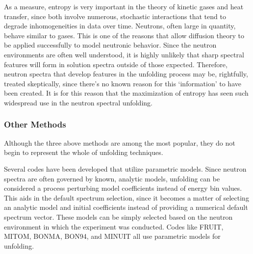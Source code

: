 As a measure, entropy is very important in the theory of kinetic gases and heat transfer, since both involve numerous, stochastic interactions that tend to degrade inhomogeneities in data over time.
Neutrons, often large in quantity, behave similar to gases.
This is one of the reasons that allow diffusion theory to be applied successfully to model neutronic behavior.
Since the neutron environments are often well understood, it is highly unlikely that sharp spectral features will form in solution spectra outside of those expected.
Therefore, neutron spectra that develop features in the unfolding process may be, rightfully, treated skeptically, since there's no known reason for this `information' to have been created.
It is for this reason that the maximization of entropy has seen such widespread use in the neutron spectral unfolding.


\subsubsection{Other Methods}

Although the three above methods are among the most popular, they do not begin to represent the whole of unfolding techniques.

Several codes have been developed that utilize parametric models.
Since neutron spectra are often governed by known, analytic models, unfolding can be considered a process perturbing model coefficients instead of energy bin values.
This aids in the default spectrum selection, since it becomes a matter of selecting an analytic model and initial coefficients instead of providing a numerical default spectrum vector.
These models can be simply selected based on the neutron environment in which the experiment was conducted.
Codes like FRUIT, MITOM, BONMA, BON94, and MINUIT all use parametric models for unfolding.

